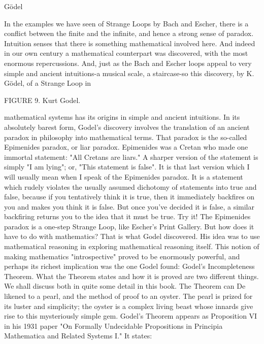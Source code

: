 Gödel 

In the examples we have seen of Strange Loops by Bach and Escher, there is a conflict between the finite and the infinite, and hence a strong sense of paradox. Intuition senses that there is something mathematical involved here. And indeed in our own century a mathematical counterpart was discovered, with the most enormous repercussions. And, just as the Bach and Escher loops appeal to very simple and ancient intuitions-a musical scale, a staircase-so this discovery, by K. Gödel, of a Strange Loop in 







FIGURE 9. Kurt Godel. 







mathematical systems has its origins in simple and ancient intuitions. In its absolutely barest form, Godel's discovery involves the translation of an ancient paradox in philosophy into mathematical terms. That paradox is the so-called Epimenides paradox, or liar paradox. Epimenides was a Cretan who made one immortal statement: "All Cretans are liars." A sharper version of the statement is simply "I am lying"; or, "This statement is false". It is that last version which I will usually mean when I speak of the Epimenides paradox. It is a statement which rudely violates the usually assumed dichotomy of statements into true and false, because if you tentatively think it is true, then it immediately backfires on you and makes you think it is false. But once you've decided it is false, a similar backfiring returns you to the idea that it must be true. Try it! The Epimenides paradox is a one-step Strange Loop, like Escher's Print Gallery. But how does it have to do with mathematics? That is what Godel discovered. His idea was to use mathematical reasoning in exploring mathematical reasoning itself. This notion of making mathematics "introspective" proved to be enormously powerful, and perhaps its richest implication was the one Godel found: Godel's Incompleteness Theorem. What the Theorem states and how it is proved are two different things. We shall discuss both in quite some detail in this book. The Theorem can De likened to a pearl, and the method of proof to an oyster. The pearl is prized for its luster and simplicity; the oyster is a complex living beast whose innards give rise to this mysteriously simple gem. Godel's Theorem appears as Proposition VI in his 1931 paper "On Formally Undecidable Propositions in Principia Mathematica and Related Systems I." It states: 

